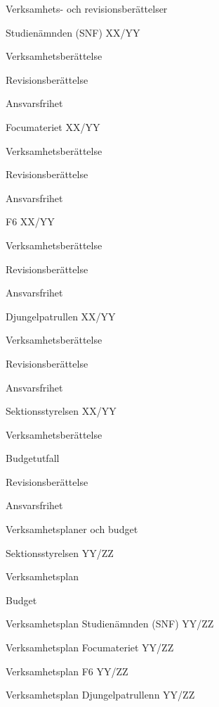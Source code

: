 \documentclass[prelim]{sektionsmote}
\begin{document}
\begin{ootd}
\item{Verksamhets- och revisionsberättelser}
\begin{ootd}
    \item Studienämnden (SNF) XX/YY
    \begin{ootd}
        \item Verksamhetsberättelse
        \item Revisionsberättelse
        \item Ansvarsfrihet
    \end{ootd}
    \item Focumateriet XX/YY
    \begin{ootd}
        \item Verksamhetsberättelse
        \item Revisionsberättelse
        \item Ansvarsfrihet
    \end{ootd}
    \item F6 XX/YY
    \begin{ootd}
        \item Verksamhetsberättelse
        \item Revisionsberättelse
        \item Ansvarsfrihet
    \end{ootd}
    \item Djungelpatrullen XX/YY
    \begin{ootd}
        \item Verksamhetsberättelse
        \item Revisionsberättelse
        \item Ansvarsfrihet
    \end{ootd}
    \item Sektionsstyrelsen XX/YY
    \begin{ootd}
        \item Verksamhetsberättelse
        \item Budgetutfall
        \item Revisionsberättelse
        \item Ansvarsfrihet
    \end{ootd}
\end{ootd}

\item{Verksamhetsplaner och budget}
\begin{ootd}
    \item Sektionsstyrelsen YY/ZZ
    \begin{ootd}
        \item Verksamhetsplan
        \item Budget
    \end{ootd}
    \item Verksamhetsplan Studienämnden (SNF) YY/ZZ
    \item Verksamhetsplan Focumateriet YY/ZZ
    \item Verksamhetsplan F6 YY/ZZ
    \item Verksamhetsplan Djungelpatrullenn YY/ZZ
\end{ootd}


\end{ootd}
\end{document}
